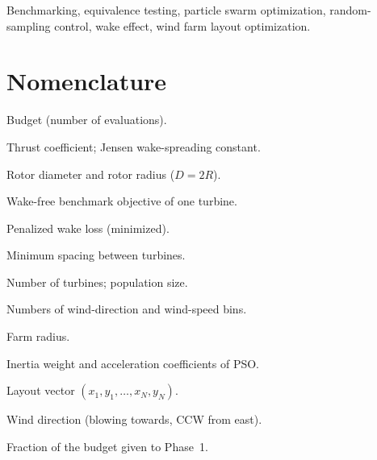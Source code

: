 \begin{abstract}
\end{abstract}

\begin{IEEEkeywords}
Benchmarking, equivalence testing, particle swarm optimization, random-sampling control, wake effect, wind farm layout optimization.
\end{IEEEkeywords}

\section*{Nomenclature}
\begin{IEEEdescription}
\item[$B$] Budget (number of evaluations).
\item[$C_T$, $K$] Thrust coefficient; Jensen wake-spreading constant.
\item[$D$, $R$] Rotor diameter and rotor radius ($D=2R$).
\item[$E_{\rm ideal}$] Wake-free benchmark objective of one turbine.
\item[$F_p$] Penalized wake loss (minimized).
\item[$\ell_{\min}$] Minimum spacing between turbines.
\item[$N$, $N_p$] Number of turbines; population size.
\item[$N_\theta$, $N_s$] Numbers of wind-direction and wind-speed bins.
\item[$r$] Farm radius.
\item[$w$, $c_1$, $c_2$] Inertia weight and acceleration coefficients of PSO.
\item[$\mathbf X$] Layout vector $(x_1,y_1,\ldots,x_N,y_N)$.
\item[$\theta$] Wind direction (blowing towards, CCW from east).
\item[$\omega$] Fraction of the budget given to Phase~1.
\end{IEEEdescription}
